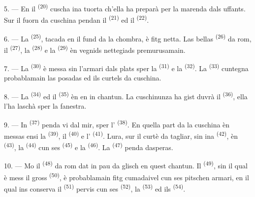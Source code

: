 5. --- En il  \textsuperscript{(20)} cuscha ina tuorta ch'ella ha
preparà per la marenda dals uffants. Sur il fuorn da cuschina pendan il
 \textsuperscript{(21)} ed il 
\textsuperscript{(22)}.

\VUsaut{4.0mm}
\VUsaut{3.0mm}

6. --- La  \textsuperscript{(25)}, tacada en il fund da
la chombra, è fitg netta. Las bellas  \textsuperscript{(26)} da
rom, il  \textsuperscript{(27)}, la 
\textsuperscript{(28)} e la  \textsuperscript{(29)} èn vegnids nettegiads
premurusamain.

7. --- La  \textsuperscript{(30)} è messa sin l'armari dals
plats sper la  \textsuperscript{(31)} e la 
\textsuperscript{(32)}. La  \textsuperscript{(33)} cuntegna
probablamain las posadas ed ils curtels da cuschina.

8. --- La  \textsuperscript{(34)} ed il 
\textsuperscript{(35)} èn en in chantun. La cuschinunza ha gist duvrà il  \textsuperscript{(36)}, ella l'ha laschà sper la fanestra.

9. --- In  \textsuperscript{(37)} penda vi dal mir, sper
l' \textsuperscript{(38)}. En quella part da la cuschina èn messas ensi
la  \textsuperscript{(39)}, il 
\textsuperscript{(40)} e l' \textsuperscript{(41)}. Lura, sur
il curtè da tagliar, sin ina  \textsuperscript{(42)}, èn
 \textsuperscript{(43)}, la  \textsuperscript{(44)} cun
ses  \textsuperscript{(45)} e la 
\textsuperscript{(46)}. La  \textsuperscript{(47)} penda dasperas.

10. --- Mo il  \textsuperscript{(48)} da rom dat in pau da glisch en
quest chantun. Il  \textsuperscript{(49)}, sin il qual è mess il
gross  \textsuperscript{(50)}, è probablamain fitg cumadaivel cun ses
pitschen armari, en il qual ins conserva il 
\textsuperscript{(51)} pervis cun ses  \textsuperscript{(52)}, la
 \textsuperscript{(53)} ed ils 
\textsuperscript{(54)}.

